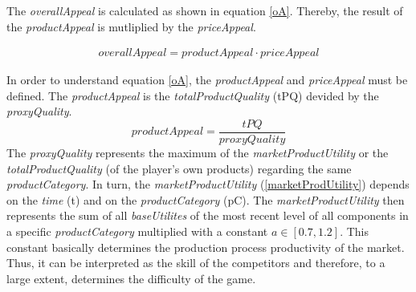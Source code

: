 The \textit{overallAppeal} is calculated as shown in equation \ref{oA}. Thereby, the result of the \textit{productAppeal} is mutliplied by the \textit{priceAppeal}. 

\begin{equation}
\label{oA}
\begin{aligned}
overallAppeal = productAppeal \cdot priceAppeal%
\end{aligned}
\end{equation}

In order to understand equation \ref{oA}, the \textit{productAppeal} and \textit{priceAppeal} must be defined.
The \textit{productAppeal} is the \textit{totalProductQuality} (tPQ) devided by the \textit{proxyQuality}.
\begin{equation}
    productAppeal = \dfrac{tPQ}{proxyQuality}
\end{equation}
The \textit{proxyQuality} represents the maximum of the \textit{marketProductUtility} or the \textit{totalProductQuality} (of the player's own products) regarding the same \textit{productCategory}.
In turn, the \textit{marketProductUtility} (\ref{marketProdUtility}) depends on the \textit{time} (t) and on the \textit{productCategory} (\gls{pC}). The \textit{marketProductUtility} then represents the sum of all \textit{baseUtilites} of the most recent level of all components in a specific \textit{productCategory} multiplied with a constant $a \in [0.7, 1.2]$. This constant basically determines the production process productivity of the market. Thus, it can be interpreted as the skill of the competitors and therefore, to a large extent, determines the difficulty of the game.


